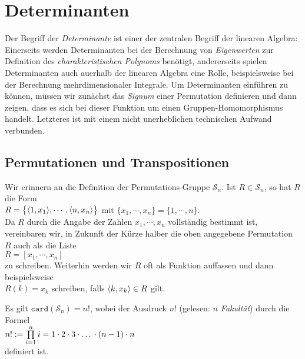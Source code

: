 \chapter{Determinanten}
Der Begriff der \emph{Determinante} ist einer der zentralen Begriff der linearen Algebra: Einerseits
werden Determinanten bei der Berechnung von \emph{Eigenwerten} zur Definition des \emph{charakteristischen Polynoms} ben\"otigt,
andererseits spielen Determinanten auch au\3erhalb der linearen Algebra eine Rolle, beispielsweise
bei der Berechnung mehrdimensionaler Integrale.  
Um Determinanten einf\"uhren zu k\"onnen, m\"ussen wir zun\"achst das \emph{Signum} einer Permutation
definieren und dann zeigen, dass es sich bei dieser Funktion um einen Gruppen-Homomorphismus handelt.
Letzteres ist mit einem nicht unerheblichen technischen Aufwand verbunden. 
\renewcommand{\labelenumi}{(\alph{enumi})}
\renewcommand{\labelenumii}{\arabic{enumii}.}


\section{Permutationen und Transpositionen}
Wir erinnern an die Definition der Permutations-Gruppe $\mathcal{S}_n$.
Ist $R \in \mathcal{S}_n$, so hat $R$ die Form
\\[0.2cm]
\hspace*{1.3cm}
$R = \bigl\{ \pair(1,x_1), \cdots, \pair(n,x_n) \bigr\}$ \quad mit $\{ x_1, \cdots, x_n \} =\{1,\cdots,n\}$.
\\[0.2cm]
Da $R$ durch die Angabe der Zahlen $x_1,\cdots,x_n$ vollst\"andig bestimmt ist, vereinbaren wir, in
Zukunft der K\"urze halber die oben angegebene Permutation $R$ auch als die Liste 
\\[0.2cm]
\hspace*{1.3cm}
$R = [x_1,\cdots,x_n]$
\\[0.2cm]
zu schreiben.  Weiterhin werden wir $R$ oft als Funktion auffassen und dann beispielsweise
\\[0.2cm]
\hspace*{1.3cm}
$R(k) = x_k$ \quad schreiben, falls \quad $\pair(k,x_k) \in R$ gilt.

\remark
Es gilt $\mathtt{card}(\mathcal{S}_n) = n!$, wobei der Ausdruck $n!$ (gelesen: \emph{$n$ Fakult\"at})
durch die Formel 
\\[0.2cm]
\hspace*{1.3cm}
$n! := \prod\limits_{i=1}^n i = 1 \cdot 2 \cdot 3 \cdot \mbox{\dots} \cdot (n-1) \cdot n$ 
\\[0.2cm] 
definiert ist. \eoxs


